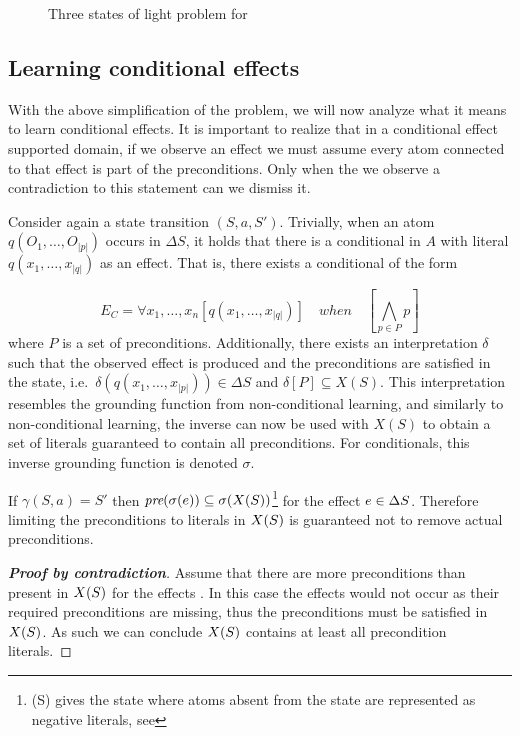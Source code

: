 \documentclass[\master/Master.tex]{subfiles}
\begin{document}
\begin{figure}
	\caption{\label{fig:ca:house-example}Three states of light problem for }
\end{figure}

\subsection{Learning conditional effects}


With the above simplification of the problem, we will now analyze what it means to learn conditional effects.
It is important to realize that in a conditional effect supported domain, if we observe an effect we must assume every atom connected to that effect is part of the preconditions. Only when the we observe a contradiction to this statement can we dismiss it. 

Consider again a state transition $(S,a,S')$. Trivially, when an atom $q\left(O_1, \dots, O_{|p|}\right)$ occurs in $\Delta S$, it holds that there is a conditional in $A$ with literal $q\left(x_1, \dots, x_{|q|}\right)$ as an effect. That is, there exists a conditional of the form

\begin{equation*}
    E_C = \forall x_1, \dots, x_n 
    \left[ q\left(x_1, \dots, x_{|q|} \right) \right] \quad when \quad 
    \left[ \bigwedge_{p \in P} p \right]
\end{equation*}
where $P$ is a set of preconditions. Additionally, there exists an interpretation $\delta$ such that the observed effect is produced and the preconditions are satisfied in the state, i.e.\ $\delta\left(q\left(x_1, \dots, x_{|p|} \right)\right) \in \Delta S$ and $\delta\left[ P \right] \subseteq X(S)$. This interpretation resembles the grounding function from non-conditional learning, and similarly to non-conditional learning, the inverse can now be used with $X(S)$ to obtain a set of literals guaranteed to contain all preconditions. For conditionals, this inverse grounding function is denoted $\sigma$.

\begin{theorem}\label{thm:ca:precondition-state}
If $\gamma (S,a) = S'$ then $\textit{pre}(\sigma(e)) \subseteq \sigma(X(S))$\footnote{\ts(S) gives the state where atoms absent from the state are represented as negative literals, see } for the effect $e \in \Delta S$.
Therefore limiting the preconditions to literals in $X(S)$ is guaranteed not to remove actual preconditions.
\end{theorem}
\begin{proof}[\textbf{Proof by contradiction}] Assume that there are more preconditions than present in $X(S)$ for the effects \geffects.
	In this case the effects would not occur as their required preconditions are missing, thus the preconditions must be satisfied in $X(S)$.
	As such we can conclude $X(S)$ contains at least all precondition literals.
\end{proof}
\end{document}
